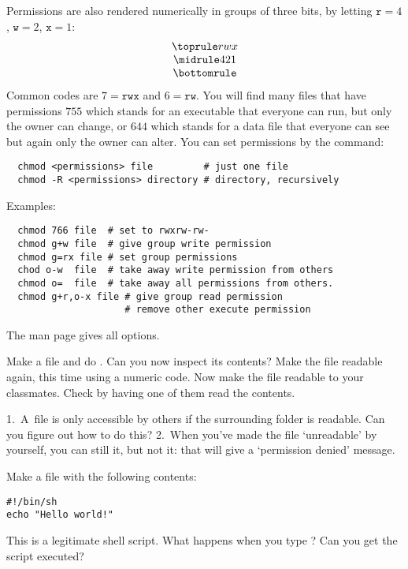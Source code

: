 Permissions are also rendered
numerically in groups of three bits, by letting
$\mathtt{r}=4$, $\mathtt{w}=2$, $\mathtt{x}=1$:
\[ \begin{array}{c}
  \toprule rwx\\ \midrule 421 \\ \bottomrule
\end{array}
\]
Common codes are $7=\mathtt{rwx}$ and $6=\mathtt{rw}$. You will find
many files that have permissions $755$ which stands for an executable
that everyone can run, but only the owner can change, or $644$ which
stands for a data file that everyone can see but again only the owner
can alter. You can set permissions by the  command:
\begin{verbatim}
  chmod <permissions> file         # just one file
  chmod -R <permissions> directory # directory, recursively
\end{verbatim}
Examples:
\begin{verbatim}
  chmod 766 file  # set to rwxrw-rw-
  chmod g+w file  # give group write permission
  chmod g=rx file # set group permissions
  chod o-w  file  # take away write permission from others
  chmod o=  file  # take away all permissions from others.
  chmod g+r,o-x file # give group read permission
                     # remove other execute permission
\end{verbatim}
The man page gives all options.

\begin{exercise}
  Make a file  and do . Can you now inspect
  its contents? Make the file readable again, this time using a
  numeric code. Now make the file readable to your classmates. Check
  by having one of them read the contents.
\end{exercise}
\begin{outcome}
  1.~A~file is only accessible by others if the surrounding folder is
  readable. Can you figure out how to do this? 2.~When you've made the
  file `unreadable' by yourself, you can still  it, but not
   it: that will give a `permission denied' message.
\end{outcome}

Make a file  with the following contents:
\begin{verbatim}
#!/bin/sh
echo "Hello world!"
\end{verbatim}
This is a legitimate shell script. What happens when you type
? Can you get the script executed?

